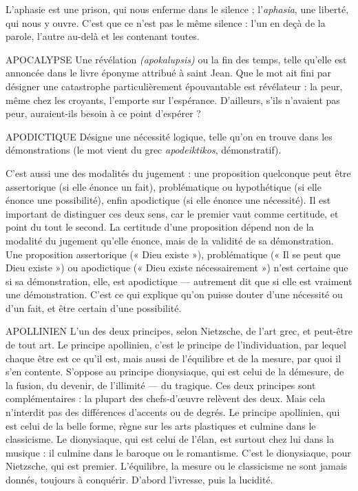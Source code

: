 L’aphasie est une prison, qui nous enferme dans le silence ; l’{\it aphasia}, une
liberté, qui nous y ouvre. C’est que ce n’est pas le même silence : l’un en deçà
de la parole, l’autre au-delà et les contenant toutes.

APOCALYPSE Une révélation {\it (apokalupsis)} ou la fin des temps, telle qu’elle
est annoncée dans le livre éponyme attribué à saint Jean. Que
le mot ait fini par désigner une catastrophe particulièrement épouvantable est
révélateur : la peur, même chez les croyants, l'emporte sur l’espérance.
D'ailleurs, s’ils n'avaient pas peur, auraient-ils besoin à ce point d’espérer ?

APODICTIQUE Désigne une nécessité logique, telle qu’on en trouve dans
les démonstrations (le mot vient du grec {\it apodeiktikos},
démonstratif).

C'est aussi une des modalités du jugement : une proposition quelconque
peut être assertorique (si elle énonce un fait), problématique ou hypothétique
(si elle énonce une possibilité), enfin apodictique (si elle énonce une nécessité).
Il est important de distinguer ces deux sens, car le premier vaut comme certitude,
et point du tout le second. La certitude d’une proposition dépend non de
la modalité du jugement qu’elle énonce, mais de la validité de sa démonstration.
Une proposition assertorique (« Dieu existe »), problématique (« Il se peut
que Dieu existe ») ou apodictique (« Dieu existe nécessairement ») n’est certaine
que si sa démonstration, elle, est apodictique — autrement dit que si elle
est vraiment une démonstration. C’est ce qui explique qu’on puisse douter
d’une nécessité ou d’un fait, et être certain d’une possibilité.

APOLLINIEN  L’un des deux principes, selon Nietzsche, de l’art grec, et peut-être
de tout art. Le principe apollinien, c’est le principe de
l'individuation, par lequel chaque être est ce qu’il est, mais aussi de l'équilibre
et de la mesure, par quoi il s’en contente. S’oppose au principe dionysiaque,
qui est celui de la démesure, de la fusion, du devenir, de l’illimité — du tragique.
Ces deux principes sont complémentaires : la plupart des chefs-d’œuvre relèvent
des deux. Mais cela n’interdit pas des différences d’accents ou de degrés.
Le principe apollinien, qui est celui de la belle forme, règne sur les arts plastiques
et culmine dans le classicisme. Le dionysiaque, qui est celui de l’élan, est
surtout chez lui dans la musique : il culmine dans le baroque ou le romantisme.
C’est le dionysiaque, pour Nietzsche, qui est premier. L'équilibre, la
mesure ou le classicisme ne sont jamais donnés, toujours à conquérir. D’abord
l'ivresse, puis la lucidité.

